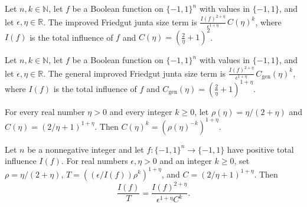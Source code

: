 \begin{definition}
\label{FABL.improvedFriedgutJuntaSizeTerm}
\leanok
{}
Let $n,k\in\mathbb N$, let $f$ be a Boolean function on $\{−1,1\}^n$ with values in
$\{−1,1\}$, and let $\epsilon,\eta\in\mathbb R$. The improved Friedgut junta size term
is $\frac{I(f)^{2+\eta}}{\epsilon^{1+\eta}}\,C(\eta)^k$, where $I(f)$ is the total
influence of $f$ and $C(\eta)=\left(\frac{2}{\eta}+1\right)^2$.
\end{definition}

\begin{definition}
\label{FABL.improvedFriedgutGeneralJuntaSizeTerm}
\leanok
{}
Let $n,k\in\mathbb N$, let $f$ be a Boolean function on $\{−1,1\}^n$ with values in
$\{−1,1\}$, and let $\epsilon,\eta\in\mathbb R$. The general improved Friedgut junta
size term is $\frac{I(f)^{2+\eta}}{\epsilon^{1+\eta}}\,C_{\mathrm{gen}}(\eta)^k$, where
$I(f)$ is the total influence of $f$ and
$C_{\mathrm{gen}}(\eta)=\left(\frac{2}{\eta}+1\right)^{1+\eta}$.
\end{definition}

\begin{theorem}
\label{FABL.improvedFriedgutGeneralConstant_pow}
\leanok
{}
For every real number $\eta>0$ and every integer $k\ge 0$, let
$\rho(\eta)=\eta/(2+\eta)$ and $C(\eta)=(2/\eta+1)^{1+\eta}$. Then
$C(\eta)^k=(\rho(\eta)^{-k})^{1+\eta}$.
\end{theorem}

\begin{theorem}
\label{FABL.improvedFriedgut_generalDenominator_identity}
\leanok
{}
Let $n$ be a nonnegative integer and let $f:\{-1,1\}^n\to\{-1,1\}$ have positive total
influence $I(f)$. For real numbers $\epsilon,\eta>0$ and an integer $k\ge0$, set
$\rho=\eta/(2+\eta)$, $T=((\epsilon/I(f))\rho^k)^{1+\eta}$, and $C=(2/\eta+1)^{1+\eta}$.
Then $$\frac{I(f)}{T}=\frac{I(f)^{2+\eta}}{\epsilon^{1+\eta}C^k}.$$
\end{theorem}

